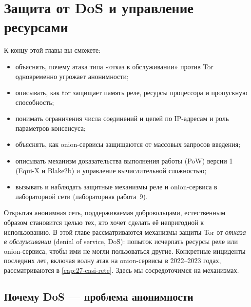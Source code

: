 \chapter{Защита от DoS и управление ресурсами}\label{cap:15-dos}

\begin{obiettivi}
К концу этой главы вы сможете:
\begin{itemize}[nosep]
  \item объяснять, почему атака типа «отказ в обслуживании» против Tor одновременно угрожает анонимности;
  \item описывать, как tor защищает память реле, ресурсы процессора и пропускную способность;
  \item понимать ограничения числа соединений и цепей по IP-адресам и роль параметров консенсуса;
  \item объяснять, как onion-сервисы защищаются от массовых запросов введения;
  \item описывать механизм доказательства выполнения работы (PoW) версии 1 (Equi-X и Blake2b) и управление вычислительной сложностью;
  \item вызывать и наблюдать защитные механизмы реле и onion-сервиса в лабораторной сети (лабораторная работа~9).
\end{itemize}
\end{obiettivi}

Открытая анонимная сеть, поддерживаемая добровольцами, естественным образом становится целью тех, кто хочет сделать её непригодной к использованию. В этой главе рассматриваются механизмы защиты Tor от \emph{отказа в обслуживании} (denial of service, DoS): попыток исчерпать ресурсы реле или onion-сервиса, чтобы ими не могли пользоваться другие. Конкретные инциденты последних лет, включая волну атак на onion-сервисы в 2022--2023 годах, рассматриваются в \cref{cap:27-casi-rete}. Здесь мы сосредоточимся на механизмах.

\section{Почему DoS --- проблема анонимности}\label{sec:dos-anonimato}


